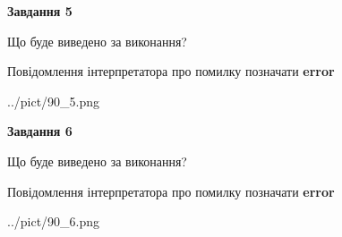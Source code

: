 \documentclass[12pt, ukrainian]{article}
\begin{document}
{{\begin {center}\textbf{Завдання 5}\end {center}}\par
Що буде виведено за виконання? \par
Повідомлення інтерпретатора про помилку позначати \textbf{error}

\begin{center}
	{../pict/90_5.png}
\end{center}
\newpage

{\begin {center}\textbf{Завдання 6}\end {center}}\par
Що буде виведено за виконання? \par
Повідомлення інтерпретатора про помилку позначати \textbf{error}

\begin{center}
	{../pict/90_6.png}
\end{center}
\newpage

}
\end{document}
